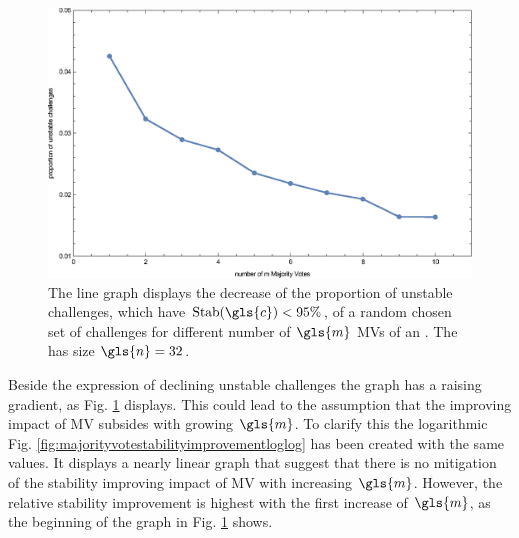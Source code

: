 \begin{figure}[ht]
\includegraphics[width=1.00\textwidth]{images/single-votes-stab-simulation.eps}
\caption[Decrease of unstable challenges of a \mpuf]{The line graph displays the decrease of the proportion of unstable challenges, which have $\Stab(\gls{c}) < 95 \%$, of a random chosen set of challenges for different number of $\gls{m}$ \acp{MV} of an \mpuf.
The \mpuf has size $\gls{n} = 32$.
} %
\label{fig:majorityvotestabilityimprovement}
\end{figure}

Beside the expression of declining unstable challenges the graph has a raising gradient, as Fig. \ref{fig:majorityvotestabilityimprovement} displays.
This could lead to the assumption that the improving impact of \ac{MV} subsides with growing $\gls{m}$.
To clarify this the logarithmic Fig. \ref{fig:majorityvotestabilityimprovementloglog} has been created with the same values.
It displays a nearly linear graph that suggest that there is no mitigation of the stability improving impact of \ac{MV} with increasing $\gls{m}$.
However, the relative stability improvement is highest with the first increase of $\gls{m}$, as the beginning of the graph in Fig.  \ref{fig:majorityvotestabilityimprovement} shows.

